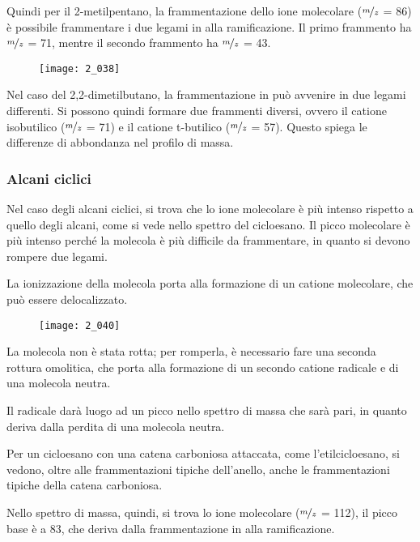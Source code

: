 Quindi per il 2-metilpentano, la frammentazione dello ione molecolare
($\nicefrac{m}{z}$ = 86) è possibile frammentare i due legami in \alpha{} alla
ramificazione. Il primo frammento ha $\nicefrac{m}{z}$ = 71, mentre il secondo
frammento ha $\nicefrac{m}{z}$ = 43.

\begin{figure}[H]
  \texttt{[image: 2\_038]}
\end{figure}

Nel caso del 2,2-dimetilbutano, la frammentazione in \alpha{} può
avvenire in due legami differenti. Si possono quindi formare due
frammenti diversi, ovvero il catione isobutilico ($\nicefrac{m}{z}$ = 71) e il catione
t-butilico ($\nicefrac{m}{z}$ = 57). Questo spiega le differenze di abbondanza nel
profilo di massa.

\subsubsection{Alcani ciclici}

Nel caso degli alcani ciclici, si trova che lo ione molecolare è più
intenso rispetto a quello degli alcani, come si vede nello spettro del
cicloesano. Il picco molecolare è più intenso perché la molecola è più
difficile da frammentare, in quanto si devono rompere due legami.

La ionizzazione della molecola porta alla formazione di un catione
molecolare, che può essere delocalizzato.

\begin{figure}[H]
  \texttt{[image: 2\_040]}
\end{figure}


La molecola non è stata rotta; per romperla, è necessario fare una
seconda rottura omolitica, che porta alla formazione di un secondo
catione radicale e di una molecola neutra.

Il radicale darà luogo ad un picco nello spettro di massa che sarà pari,
in quanto deriva dalla perdita di una molecola neutra.

Per un cicloesano con una catena carboniosa attaccata, come
l'etilcicloesano, si vedono, oltre alle frammentazioni tipiche
dell'anello, anche le frammentazioni tipiche della catena carboniosa.


Nello spettro di massa, quindi, si trova lo ione molecolare ($\nicefrac{m}{z}$ = 112),
il picco base è a 83, che deriva dalla frammentazione in \alpha{} alla
ramificazione.

